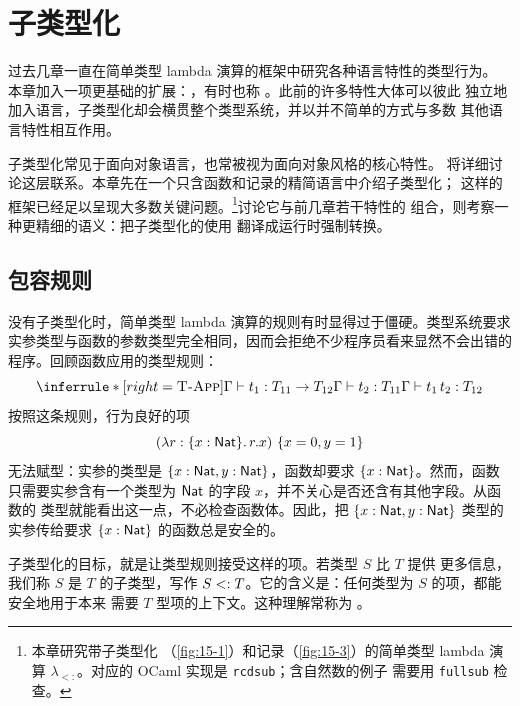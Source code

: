 
\chapter{子类型化}
\label{chap:15}

过去几章一直在简单类型 lambda 演算的框架中研究各种语言特性的类型行为。
本章加入一项更基础的扩展：，有时也称
。此前的许多特性大体可以彼此
独立地加入语言，子类型化却会横贯整个类型系统，并以并不简单的方式与多数
其他语言特性相互作用。

子类型化常见于面向对象语言，也常被视为面向对象风格的核心特性。
将详细讨论这层联系。本章先在一个只含函数和记录的精简语言中介绍子类型化；
这样的框架已经足以呈现大多数关键问题。\footnote{本章研究带子类型化
（\cref{fig:15-1}）和记录（\cref{fig:15-3}）的简单类型 lambda 演算
\(\lambda_{<:}\)。对应的 OCaml 实现是 \texttt{rcdsub}；含自然数的例子
需要用 \texttt{fullsub} 检查。}讨论它与前几章若干特性的
组合，则考察一种更精细的语义：把子类型化的使用
翻译成运行时强制转换。

\section{包容规则}
\label{sec:15.1}

没有子类型化时，简单类型 lambda 演算的规则有时显得过于僵硬。类型系统要求
实参类型与函数的参数类型完全相同，因而会拒绝不少程序员看来显然不会出错的
程序。回顾函数应用的类型规则：
\[
\inferrule*[right=\textsc{T-App}]
 {\Gamma\vdash t_1:T_{11}\to T_{12}\\
  \Gamma\vdash t_2:T_{11}}
 {\Gamma\vdash t_1\,t_2:T_{12}}
\]
按照这条规则，行为良好的项
\[
(\lambda r:\{x:\tapltype{Nat}\}.\,r.x)\ \{x=0,y=1\}
\]
无法赋型：实参的类型是
\(\{x:\mathsf{Nat},y:\mathsf{Nat}\}\)，函数却要求
\(\{x:\mathsf{Nat}\}\)。然而，函数只需要实参含有一个类型为
\(\mathsf{Nat}\) 的字段 \(x\)，并不关心是否还含有其他字段。从函数的
类型就能看出这一点，不必检查函数体。因此，把
\(\{x:\mathsf{Nat},y:\mathsf{Nat}\}\) 类型的实参传给要求
\(\{x:\mathsf{Nat}\}\) 的函数总是安全的。

子类型化的目标，就是让类型规则接受这样的项。若类型 \(S\) 比 \(T\) 提供
更多信息，我们称 \(S\) 是 \(T\) 的子类型，写作
\(S\mathrel{<:} T\)。它的含义是：任何类型为 \(S\) 的项，都能安全地用于本来
需要 \(T\) 型项的上下文。这种理解常称为
。

